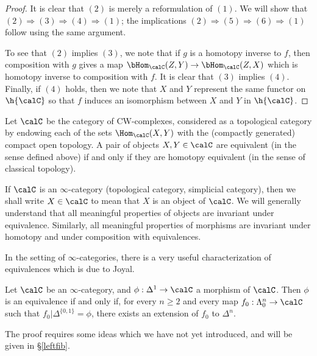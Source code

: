 \begin{proof}
It is clear that $(2)$ is merely a reformulation of $(1)$. We will
show that $(2) \Rightarrow (3) \Rightarrow (4) \Rightarrow (1)$;
the implications $(2) \Rightarrow (5) \Rightarrow (6) \Rightarrow
(1)$ follow using the same argument.

To see that $(2)$ implies $(3)$, we note that if $g$ is a homotopy
inverse to $f$, then composition with $g$ gives a map
$\bHom_{\calC}(Z,Y) \rightarrow \bHom_{\calC}(Z,X)$ which is
homotopy inverse to composition with $f$. It is clear that $(3)$
implies $(4)$. Finally, if $(4)$ holds, then we note that $X$ and
$Y$ represent the same functor on $\h{\calC}$ so that $f$ induces an
isomorphism between $X$ and $Y$ in $\h{\calC}$.
\end{proof}

\begin{example}
Let $\calC$ be the category of CW-complexes, considered as a topological category by endowing
each of the sets $\Hom_{\calC}(X,Y)$ with the (compactly generated) compact open topology. A pair of objects $X,Y \in \calC$ are equivalent (in the sense defined above) if and only if they are homotopy equivalent (in the sense of classical topology).
\end{example}

If $\calC$ is an $\infty$-category (topological category, simplicial category), then we
shall write $X \in \calC$ to mean that $X$ is an object of
$\calC$. We will generally understand that all meaningful properties of
objects are invariant under equivalence. Similarly, all
meaningful properties of morphisms are invariant under
homotopy and under composition with equivalences.

In the setting of $\infty$-categories, there is a very useful characterization of equivalences which is due to Joyal.

\begin{proposition}\label{greenlem}
Let $\calC$ be an $\infty$-category, and $\phi: \Delta^1 \rightarrow \calC$ a morphism of $\calC$. Then $\phi$ is an equivalence if and only if, for every $n \geq 2$ and every map
$f_0: \Lambda^n_0 \rightarrow \calC$ such that $f_0 | \Delta^{\{0,1\}} = \phi$,
there exists an extension of $f_0$ to $\Delta^n$.
\end{proposition}

The proof requires some ideas which we have not yet introduced, and will be given in \S \ref{leftfib}.


